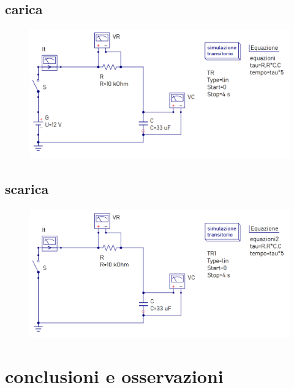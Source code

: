 \documentclass[12pt]{article}
\begin{document}
\subsection*{carica}

\begin{figure}[!h]
  \includegraphics[width=\linewidth]{data/carica-simulazione-qucs.png}
\end{figure}

\subsection*{scarica}

\begin{figure}[!h]
  \includegraphics[width=\linewidth]{data/scarica-simulazione-qucs.png}
\end{figure}

\newpage

\section*{conclusioni e osservazioni}
\blindtext[1]
\end{document}
